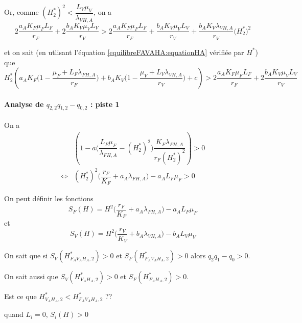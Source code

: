 \documentclass{article}
\newcommand{\lfa}{\lambda_{FH, A}}
\newcommand{\lva}{\lambda_{VH, A}}
\begin{document}
Or, comme $(H_2^*)^2 < \dfrac{L_V \mu_V}{\lva}$, on a 
$$
2 \dfrac{a_A K_F \mu_F L_F}{r_F} + 2 \dfrac{b_A K_V \mu_V L_V}{r_V} > 2 \dfrac{a_A K_F \mu_F L_F}{r_F} + \dfrac{b_A K_V \mu_V L_V}{r_V} + \dfrac{b_A K_V \lva}{r_V  }\Big(H^*_2\Big)^2  
$$

et on sait (en utlisant l'équation \eqref{equilibreFAVAHA:equationHA} vérifiée par $H^*$) que 
$$
H^*_2 \left( a_A K_F \Big(1-\dfrac{\mu_F +L_F \lfa}{r_F}\Big) + b_A K_V \Big(1-\dfrac{\mu_V +L_V \lva}{r_V}\Big) + c \right) > 2 \dfrac{a_A K_F \mu_F L_F}{r_F} + 2 \dfrac{b_A K_V \mu_V L_V}{r_V} 
$$

\paragraph{Analyse de $q_{2,2}q_{1,2} -q_{0,2}$ : piste 1}
On a 
\begin{align*}
&\left(1 - a \Big(\dfrac{L_F\mu_F}{\lfa}-(H^*_2)^2\Big) \dfrac{K_F\lfa}{r_F(H^*_2)^2}\right) > 0 \\
\Leftrightarrow &(H^*_2)^2 \Big(\dfrac{r_F}{K_F} + a_A \lfa \Big) - a_AL_F \mu_F > 0
\end{align*}
 

On peut définir les fonctions 
\begin{equation}
S_F(H) = H^2 \Big(\dfrac{r_F}{K_F} + a_A \lfa \Big) - a_AL_F \mu_F
\end{equation}
et 
\begin{equation}
S_V(H) = H^2 \Big(\dfrac{r_V}{K_V} + b_A \lva \Big) - b_AL_V \mu_V
\end{equation}


On sait que si $S_V(H^*_{F_AV_AH_A,2}) > 0$ et $S_F(H^*_{F_AV_AH_A,2}) > 0$ alors $q_2q_1 - q_0 > 0$.

On sait aussi que $S_V(H^*_{V_AH_A,2}) > 0$ et $S_F(H^*_{F_AH_A,2}) > 0$.

Est ce que $H^*_{V_AH_A,2} < H^*_{F_AV_AH_A,2}$ ??

quand $L_i = 0$,  $S_i(H) > 0$ 




\newpage
\end{document}
